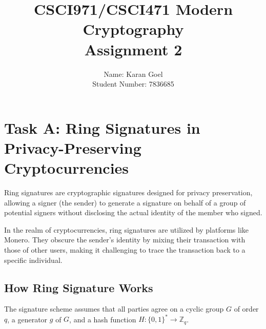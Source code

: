 \documentclass[12pt]{article}
\begin{document}

\title{
    CSCI971/CSCI471 Modern Cryptography \\
    Assignment 2 \\}


\author{
Name: Karan Goel \\
Student Number: 7836685
}

\maketitle

\section{Task A: Ring Signatures in Privacy-Preserving Cryptocurrencies}


Ring signatures are cryptographic signatures designed for privacy preservation, allowing a signer (the sender) to generate a signature on behalf of a group of potential signers without disclosing the actual identity of the member who signed.

In the realm of cryptocurrencies, ring signatures are utilized by platforms like Monero. They obscure the sender's identity by mixing their transaction with those of other users, making it challenging to trace the transaction back to a specific individual.

\subsection{How Ring Signature Works}

The signature scheme assumes that all parties agree on a cyclic group \( G \) of order \( q \), a generator \( g \) of \( G \), and a hash function \( H: \{0,1\}^* \to \mathbb{Z}_q \).
\end{document}
